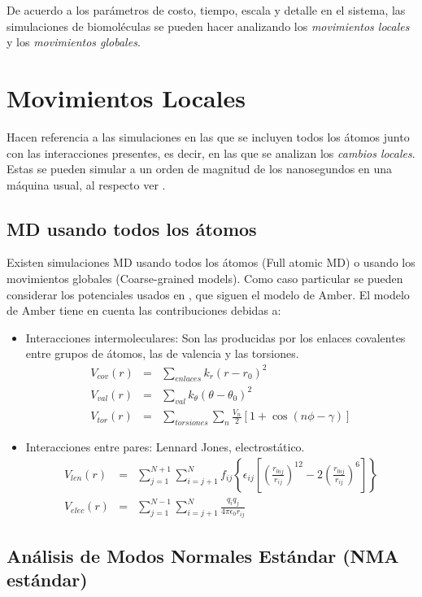 De acuerdo a los par\'{a}metros de costo, tiempo, escala y detalle en el sistema, las simulaciones de biomol\'{e}culas se pueden hacer analizando los \textit{movimientos locales} y los \textit{movimientos globales}.
\section{Movimientos Locales}
Hacen referencia a las simulaciones en las que se incluyen todos los \'{a}tomos junto con las interacciones presentes, es decir, en las que se analizan los \textit{cambios locales}. Estas se pueden simular a un orden de magnitud de los nanosegundos en una m\'{a}quina usual, al respecto ver \cite{Gur2013}.
\subsection{MD usando todos los \'{a}tomos}
Existen simulaciones MD usando todos los \'{a}tomos (Full atomic MD) o usando los movimientos globales (Coarse-grained models). Como caso particular se pueden considerar los potenciales usados en \cite{Amber2016}, que siguen el modelo de Amber. El modelo de Amber tiene en cuenta las contribuciones debidas a:
 \begin{itemize}
\item Interacciones intermoleculares: Son las producidas por los enlaces covalentes entre grupos de \'{a}tomos, las de valencia y las torsiones.
\begin{eqnarray}
V_{cov}(r)&=&\sum_{enlaces}k_r\left(r-r_0\right)^2\\
V_{val}(r)&=&\sum_{val}k_\theta\left(\theta-\theta_0\right)^2\\
V_{tor}(r)&=&\sum_{torsiones}\sum_{n}\frac{V_n}{2}\left[1+\cos(n\phi-\gamma)\right]
\end{eqnarray}
\item Interacciones entre pares: Lennard Jones, electrost\'{a}tico.
\begin{eqnarray}
V_{len}(r)&=&\sum_{j=1}^{N+1}\sum_{i=j+1}^N f_{ij}\left\{\epsilon_{ij}\left[\left(\frac{r_{0ij}}{r_{ij}}\right)^{12}-2\left(\frac{r_{0ij}}{r_{ij}}\right)^6\right]\right\}\\
V_{elec}(r)&=&\sum_{j=1}^{N-1}\sum_{i=j+1}^{N}\frac{q_iq_j}{4\pi\epsilon_0r_{ij}}
\end{eqnarray}
\end{itemize}
\subsection{An\'{a}lisis de Modos Normales Est\'{a}ndar (NMA est\'{a}ndar)}\label{NMAsta}

